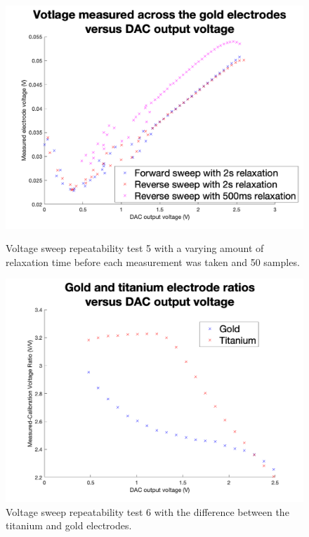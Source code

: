 \begin{figure}[ht]
    \begin{minipage}{0.5\textwidth}
        \centering
        \includegraphics[width=\textwidth]{Figures/Testing/Aus8}
        \caption{Voltage sweep repeatability test 5 with a varying amount of relaxation time before each measurement was taken and 50 samples.}
        \label{fig:test5} %
        \end{minipage}
    \begin{minipage}{0.5\textwidth}
        \centering
        \includegraphics[width=\textwidth]{Figures/Testing/AusTi15}
        \caption{Voltage sweep repeatability test 6 with the difference between the titanium and gold electrodes.}
        \label{fig:test6} %
    \end{minipage}
\end{figure}
